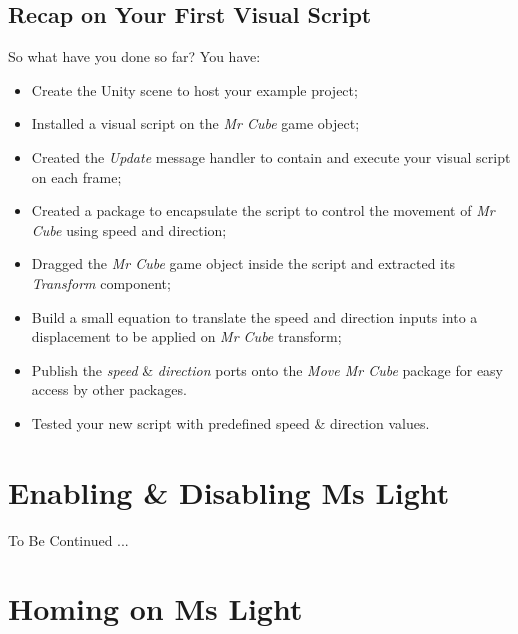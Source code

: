\section{Recap on Your First Visual Script}
\label{recaponyourfirstvisualscript}

So what have you done so far? You have:

\begin{itemize}
\item Create the Unity scene to host your example project;

\item Installed a visual script on the \emph{Mr Cube} game object;

\item Created the \emph{Update} message handler to contain and execute your visual script on each frame;

\item Created a package to encapsulate the script to control the movement of \emph{Mr Cube} using speed and direction;

\item Dragged the \emph{Mr Cube} game object inside the script and extracted its \emph{Transform} component;

\item Build a small equation to translate the speed and direction inputs into a displacement to be applied on \emph{Mr Cube} transform;

\item Publish the \emph{speed} \& \emph{direction} ports onto the \emph{Move Mr Cube} package for easy access by other packages.

\item Tested your new script with predefined speed \& direction values.

\end{itemize}

\chapter{Enabling \& Disabling Ms Light}
\label{enablingdisablingmslight}

\begin{tipbox}


{\Large \color{black} To Be Continued ... }

\end{tipbox}


\chapter{Homing on Ms Light}
\label{homingonmslight}

